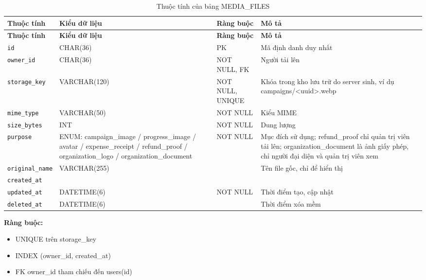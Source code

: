 {\small
\begin{longtable}{|P{3.2cm}|P{2.8cm}|P{2.2cm}|p{5.4cm}|}
    \caption{Thuộc tính của bảng MEDIA\_\allowbreak{}FILES}
    \label{tab:media_files} \\
    \hline
    \textbf{Thuộc tính} & \textbf{Kiểu dữ liệu} & \textbf{Ràng buộc} & \textbf{Mô tả} \\
    \hline
    \endfirsthead
    \hline
    \textbf{Thuộc tính} & \textbf{Kiểu dữ liệu} & \textbf{Ràng buộc} & \textbf{Mô tả} \\
    \hline
    \endhead

    \texttt{id} & CHAR(36) & PK & Mã định danh duy nhất \\
    \hline
    \texttt{owner\_\allowbreak{}id} & CHAR(36) & NOT NULL, FK & Người tải lên \\
    \hline
    \texttt{storage\_\allowbreak{}key} & VARCHAR(120) & NOT NULL, UNIQUE & Khóa trong kho lưu trữ do server sinh, ví dụ campaigns/\textless{}uuid\textgreater{}.webp \\
    \hline
    \texttt{mime\_\allowbreak{}type} & VARCHAR(50) & NOT NULL & Kiểu MIME \\
    \hline
    \texttt{size\_\allowbreak{}bytes} & INT & NOT NULL & Dung lượng \\
    \hline
    \texttt{purpose} & ENUM: campaign\_\allowbreak{}image / progress\_\allowbreak{}image / avatar / expense\_\allowbreak{}receipt / refund\_\allowbreak{}proof / organization\_\allowbreak{}logo / organization\_\allowbreak{}document & NOT NULL & Mục đích sử dụng; refund\_\allowbreak{}proof chỉ quản trị viên tải lên; organization\_\allowbreak{}document là ảnh giấy phép, chỉ người đại diện và quản trị viên xem \\
    \hline
    \texttt{original\_\allowbreak{}name} & VARCHAR(255) &  & Tên file gốc, chỉ để hiển thị \\
    \hline
    \texttt{created\_\allowbreak{}at} &  &  &  \\
    \hline
    \texttt{updated\_\allowbreak{}at} & DATETIME(6) & NOT NULL & Thời điểm tạo, cập nhật \\
    \hline
    \texttt{deleted\_\allowbreak{}at} & DATETIME(6) &  & Thời điểm xóa mềm \\
    \hline
\end{longtable}
}

\textbf{Ràng buộc:}
\begin{itemize}
    \item UNIQUE trên storage\_\allowbreak{}key
    \item INDEX (owner\_\allowbreak{}id, created\_\allowbreak{}at)
    \item FK owner\_\allowbreak{}id tham chiếu đến users(id)
\end{itemize}

